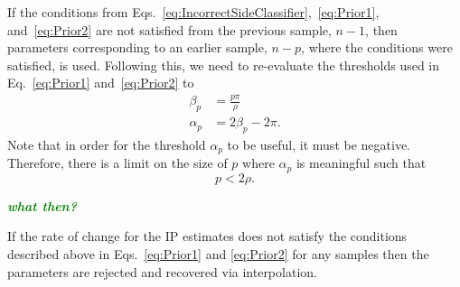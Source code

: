 \documentclass[a4paper]{IEEEtran}
\newcommand{\dean}[1]{\textsf{\emph{\textbf{\textcolor{green}{#1}}}}}
\begin{document}
If the conditions from Eqs.~\ref{eq:IncorrectSideClassifier},~\ref{eq:Prior1}, and~\ref{eq:Prior2} are not satisfied from the previous sample, $n-1$, then parameters corresponding to an earlier sample, $n-p$, where the conditions were satisfied, is used. Following this, we need to re-evaluate the thresholds used in Eq.~\ref{eq:Prior1} and~\ref{eq:Prior2} to
\begin{align}
	\beta_p &= \frac{p\pi}{\rho} \\
	\alpha_p &=2\beta_p-2\pi.
\end{align}
Note that in order for the threshold $\alpha_p$ to be useful, it must be negative. Therefore, there is a limit on the size of $p$ where $\alpha_p$ is meaningful such that
\begin{equation}
	p < 2\rho.
\end{equation}

\dean{what then?}

If the rate of change for the IP estimates does not satisfy the conditions described above in Eqs.~\ref{eq:Prior1} and \ref{eq:Prior2} for any samples then the parameters are rejected and recovered via interpolation.
\end{document}
